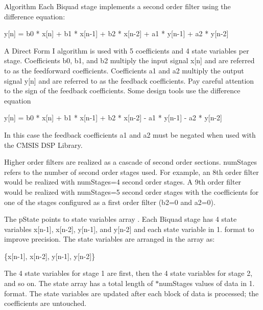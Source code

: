 \begin{DoxyParagraph}{Algorithm}
Each Biquad stage implements a second order filter using the difference equation\+: 
\begin{DoxyPre}
    y[n] = b0 * x[n] + b1 * x[n-1] + b2 * x[n-2] + a1 * y[n-1] + a2 * y[n-2]
\end{DoxyPre}
 A Direct Form I algorithm is used with 5 coefficients and 4 state variables per stage. Coefficients {\ttfamily b0, b1, and b2 } multiply the input signal {\ttfamily x\mbox{[}n\mbox{]}} and are referred to as the feedforward coefficients. Coefficients {\ttfamily a1} and {\ttfamily a2} multiply the output signal {\ttfamily y\mbox{[}n\mbox{]}} and are referred to as the feedback coefficients. Pay careful attention to the sign of the feedback coefficients. Some design tools use the difference equation 
\begin{DoxyPre}
    y[n] = b0 * x[n] + b1 * x[n-1] + b2 * x[n-2] - a1 * y[n-1] - a2 * y[n-2]
\end{DoxyPre}
 In this case the feedback coefficients {\ttfamily a1} and {\ttfamily a2} must be negated when used with the C\+M\+S\+IS D\+SP Library.
\end{DoxyParagraph}
\begin{DoxyParagraph}{}
Higher order filters are realized as a cascade of second order sections. {\ttfamily num\+Stages} refers to the number of second order stages used. For example, an 8th order filter would be realized with {\ttfamily num\+Stages=4} second order stages. A 9th order filter would be realized with {\ttfamily num\+Stages=5} second order stages with the coefficients for one of the stages configured as a first order filter ({\ttfamily b2=0} and {\ttfamily a2=0}).
\end{DoxyParagraph}
\begin{DoxyParagraph}{}
The {\ttfamily p\+State} points to state variables array . Each Biquad stage has 4 state variables {\ttfamily x\mbox{[}n-\/1\mbox{]}, x\mbox{[}n-\/2\mbox{]}, y\mbox{[}n-\/1\mbox{]},} and {\ttfamily y\mbox{[}n-\/2\mbox{]}} and each state variable in 1. format to improve precision. The state variables are arranged in the array as\+: 
\begin{DoxyPre}
    \{x[n-1], x[n-2], y[n-1], y[n-2]\}
\end{DoxyPre}

\end{DoxyParagraph}
\begin{DoxyParagraph}{}
The 4 state variables for stage 1 are first, then the 4 state variables for stage 2, and so on. The state array has a total length of {$\ast$num\+Stages} values of data in 1. format. The state variables are updated after each block of data is processed; the coefficients are untouched.
\end{DoxyParagraph}
